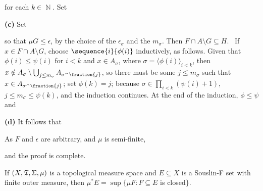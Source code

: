 {\noindent for each $k\in\BbbN$.  Set


\medskip

{\bf (c)} Set


\noindent so that $\mu G\le\epsilon$, by the choice of the
$\epsilon_{\sigma}$ and the $m_{\sigma}$.   Then
$F\cap A\setminus G\subseteq H$.
\Prf\ If $x\in F\cap A\setminus G$, choose
$\sequence{i}{\phi(i)}$ inductively, as follows.   Given that
$\phi(i)\le\psi(i)$ for $i<k$ and $x\in A_{\sigma}$, where
$\sigma=\langle\phi(i)\rangle_{i<k}$, then $x\notin
A_{\sigma}\setminus\bigcup_{j\le m_{\sigma}}A_{\sigma^{\smallfrown}\fraction{j}}$,
so there must be some $j\le m_{\sigma}$ such that
$x\in A_{\sigma^{\smallfrown}\fraction{j}}$;  set $\phi(k)=j$;  because
$\sigma\in\prod_{i<k}(\psi(i)+1)$, $j\le m_{\sigma}\le\psi(k)$, and the
induction continues.   At the end of the induction, $\phi\le\psi$ and


\medskip

{\bf (d)} It follows that


\noindent As $F$ and $\epsilon$ are arbitrary, and $\mu$ is semi-finite,


\noindent and the proof is complete.
}%

 If $(X,\frak T,\Sigma,\mu)$ is a topological
measure space and $E\subseteq X$ is a Souslin-F set with finite outer
measure, then $\mu^*E=\sup\{\mu F:F\subseteq E$ is closed$\}$.


